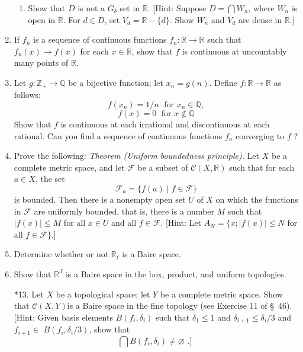 \begin{enumerate}[itemsep=0.4em, parsep=0pt, topsep=0pt, partopsep=0pt, leftmargin=*, label=\arabic*., ref=\arabic*]
\begin{enumerate}[itemsep=0.2em, parsep=0pt, topsep=0pt, partopsep=0pt, leftmargin=*, label=(\alph*), align=left]
 \item Show that \(D\) is not a \(G_{\delta }\) set in \(\mathbb{R}\). [Hint: Suppose \(D = \bigcap {W}_{n}\), where \(W_{n}\) is open in \(\mathbb{R}\). For \(d \in D\), set \(V_{d} = \mathbb{R} - \{ d\}\). Show \(W_{n}\) and \(V_{d}\) are dense in \(\mathbb{R}\).]
 \end{enumerate}
\item If \(f_{n}\) is a sequence of continuous functions \(f_{n} : \mathbb{R} \rightarrow \mathbb{R}\) such that \(f_{n}(x) \rightarrow f(x)\) for each \(x \in \mathbb{R}\), show that \(f\) is continuous at uncountably many points of \(\mathbb{R}\).
\item Let \(g : \mathbb{Z}_{ + } \rightarrow \mathbb{Q}\) be a bijective function; let \(x_{n} = g(n)\). Define \(f : \mathbb{R} \rightarrow \mathbb{R}\) as follows: \[ f(x_{n}) = 1/n\;\text{ for }x_{n} \in \mathbb{Q}, \] \[ f(x) = 0\;\text{ for }x \notin \mathbb{Q} \] Show that \(f\) is continuous at each irrational and discontinuous at each rational. Can you find a sequence of continuous functions \(f_{n}\) converging to \(f\) ?
\item Prove the following: \textsl{Theorem (Uniform boundedness principle).} Let \(X\) be a complete metric space, and let \(\mathcal{F}\) be a subset of \(\mathcal{C}({X,\mathbb{R}})\) such that for each \(a \in X\), the set \[ \mathcal{F}_{a} = \{ f( a) \mid f \in \mathcal{F}\} \] is bounded. Then there is a nonempty open set \(U\) of \(X\) on which the functions in \(\mathcal{F}\) are uniformly bounded, that is, there is a number \(M\) such that \(| {f(x) }| \leq M\) for all \(x \in U\) and all \(f \in \mathcal{F}\). [Hint: Let \(A_{N} = \{ x;| {f(x) }| \leq N\) for all \(f \in \mathcal{F}\}\).] 
\item Determine whether or not \(\mathbb{R}_{\ell }\) is a Baire space.
\item Show that \(\mathbb{R}^{J}\) is a Baire space in the box, product, and uniform topologies.
\item[*13.] Let \(X\) be a topological space; let \(Y\) be a complete metric space. Show that \(\mathcal{C}({X,Y})\)is a Baire space in the fine topology (see Exercise 11 of \S\ 46). [Hint: Given basis elements \(B({f_{i},{\delta }_{i}})\) such that \({\delta }_{1} \leq 1\) and \({\delta }_{i + 1} \leq {\delta }_{i}/3\) and \(f_{i + 1} \in\) \(B({f_{i},{\delta }_{i}/3})\), show that \[ \bigcap B({f_{i},{\delta }_{i}}) \neq \varnothing \text{ .] } \]
\end{enumerate}

